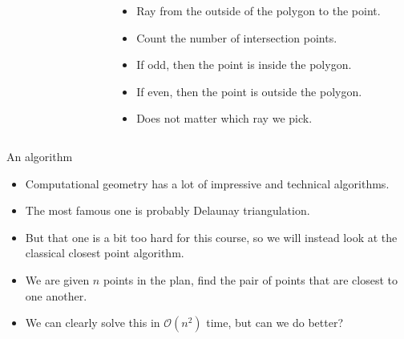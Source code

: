 \documentclass{beamer}
\begin{document}
\begin{frame}[plain]
\begin{columns}
\begin{column}{0.6\textwidth}
\begin{figure}
      \end{figure}
    \end{column}
    \begin{column}{0.5\textwidth}
      \begin{itemize}
        \item Ray from the outside of the polygon to the point.
        \item Count the number of intersection points.
        \item If odd, then the point is inside the polygon.
        \item If even, then the point is outside the polygon.
        \item Does not matter which ray we pick.
      \end{itemize}
    \end{column}
  \end{columns}
\end{frame}

\begin{frame}[plain]{An algorithm}
	\begin{itemize}
        \item Computational geometry has a lot of impressive and technical algorithms.
        \item The most famous one is probably Delaunay triangulation.
        \item But that one is a bit too hard for this course, so we will instead look at the classical closest point algorithm.
        \item We are given $n$ points in the plan, find the pair of points that are closest to one another.
        \item We can clearly solve this in $\mathcal{O}(n^2)$ time, but can we do better?
    \end{itemize}
\end{frame}
\end{document}
